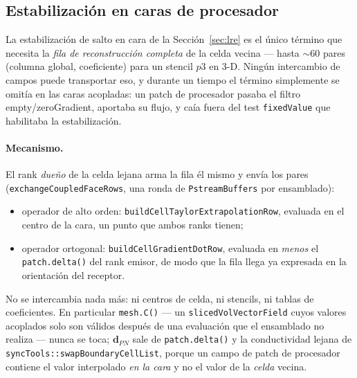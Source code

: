 \documentclass[11pt,a4paper]{article}
\newcommand{\code}[1]{\texttt{\small #1}}
\begin{document}
\subsection{Estabilización en caras de procesador}
\label{sec:dist-stab}

La estabilización de salto en cara de la Sección~\ref{sec:lre} es el único
término que necesita la \emph{fila de reconstrucción completa} de la celda
vecina --- hasta $\sim60$ pares (columna global, coeficiente) para un stencil
$p3$ en 3-D. Ningún intercambio de campos puede transportar eso, y durante un
tiempo el término simplemente se omitía en las caras acopladas: un patch de
procesador pasaba el filtro empty/zeroGradient, aportaba su flujo, y caía fuera
del test \code{fixedValue} que habilitaba la estabilización.

\paragraph{Mecanismo.} El rank \emph{dueño} de la celda lejana arma la fila él
mismo y envía los pares (\code{exchangeCoupledFaceRows}, una ronda de
\code{PstreamBuffers} por ensamblado):

\begin{itemize}
  \item operador de alto orden: \code{buildCellTaylorExtrapolationRow},
        evaluada en el centro de la cara, un punto que ambos ranks tienen;
  \item operador ortogonal: \code{buildCellGradientDotRow}, evaluada en
        \emph{menos} el \code{patch.delta()} del rank emisor, de modo que la
        fila llega ya expresada en la orientación del receptor.
\end{itemize}

No se intercambia nada más: ni centros de celda, ni stencils, ni tablas de
coeficientes. En particular \code{mesh.C()} --- un
\code{slicedVolVectorField} cuyos valores acoplados solo son válidos después de
una evaluación que el ensamblado no realiza --- nunca se toca;
$\mathbf{d}_{PN}$ sale de \code{patch.delta()} y la conductividad lejana de
\code{syncTools::swapBoundaryCellList}, porque un campo de patch de procesador
contiene el valor interpolado \emph{en la cara} y no el valor de la \emph{celda}
vecina.
\end{document}
